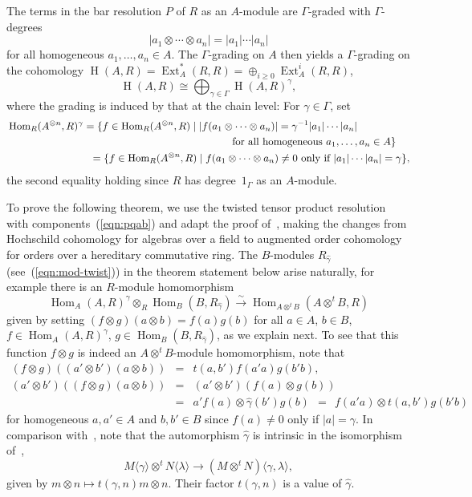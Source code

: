 \documentclass[11pt]{amsart}
\numberwithin{equation}{section}
\theoremstyle{definition}
\theoremstyle{remark}
\newcommand{\g}{\gamma}
\newcommand{\hg}{\widehat{\g}}
\newcommand\Ext{\operatorname{Ext}}
\newcommand\Homol{\operatorname{H}}
\newcommand\coh{\Homol}
\newcommand\ot{\otimes}
\newcommand\ott{\otimes^{t}\!}
\newcommand{\ttpt}{A\ott B}
\newcommand\Hom{\operatorname{Hom}}
\begin{document}
The terms in the bar resolution $P$ of $R$ as
an $A$-module are $\Gamma$-graded with $\Gamma$-degrees 
\[
    |a_1\ot\cdots\ot a_n| = |a_1|\cdots |a_n| 
\]
for all homogeneous $a_1,\ldots, a_n\in A$. 
The $\Gamma$-grading on $A$ then yields a $\Gamma$-grading
on the cohomology $\coh(A,R) = \Ext^*_A (R,R) = \oplus_{i\geq 0}\Ext^i_A(R,R)$,
\[
\coh(A,R) \cong \bigoplus_{\g\in\Gamma}  \coh(A,R)^{\g} ,
\]
where the grading is induced by that at the chain level:
For $\gamma\in\Gamma$, set 
\begin{equation*}
\begin{aligned}
 & \Hom_R (A^{\ot n}, R)^{\gamma} = 
    \{ f\in \Hom_R(A^{\ot n}, R)\mid
    |f(a_1\ot\cdots\ot a_n)| = \gamma^{-1}  |a_1|\cdots |a_n| \\
  & \hspace{7.5cm}   \mbox{ for all homogeneous } a_1,\ldots,a_n\in A\}\\
  & \hspace{2.8cm} = \{ f\in \Hom_R(A^{\ot n},R)\mid
       f(a_1\ot\cdots\ot a_n)\neq 0 \mbox{ only if }
         |a_1|\cdots |a_n| = \gamma \} ,
\end{aligned}
\end{equation*}
the second equality holding since $R$ has degree~$1_{\Gamma}$ as an $A$-module.

To prove the following theorem, we use 
the twisted tensor product resolution with components~(\ref{eqn:pqab}) and 
adapt the proof of~\cite[Theorem 3.1]{BW}, 
making the changes from Hochschild cohomology for algebras over a field
to augmented order cohomology for orders over a hereditary commutative ring. 
The $B$-modules $R_{\hg}$ (see~(\ref{eqn:mod-twist}))
in the theorem statement below arise naturally,
for example there is an $R$-module homomorphism 
\[
  \Hom_A(A,R)^{\gamma} \ot_R \Hom_B(B, R_{\hg}) \stackrel{\sim}{\longrightarrow}
   \Hom_{\ttpt} (\ttpt , R)
\]
given by setting
$(f\ot g)(a\ot b) = f(a)g(b)$ for all $a\in A$, $b\in B$,
$f\in\Hom_A(A,R)^{\gamma}$, $g\in \Hom_B(B,R_{\hg})$,
as we explain next.
To see that this function $f\ot g$ is indeed an $\ttpt$-module
homomorphism, note that 
\begin{eqnarray*}
  (f\ot g) ((a'\ot b')(a\ot b)) & = & t(a,b') f(a'a) g(b'b) , \\
  (a'\ot b') ( (f\ot g) (a\ot b)) & = & (a'\ot b') (f(a)\ot g(b)) \\
 & = & a'f(a) \ot \hg(b') g(b) \ \ = \ \ f(a'a) \ot t(a,b') g(b'b)
\end{eqnarray*}
for homogeneous $a,a'\in A$ and $b,b'\in B$ since $f(a)\neq 0$ only if $|a|=\gamma$.
In comparison with~\cite{BO}, note that the automorphism $\hg$ is intrinsic in the isomorphism
of~\cite[Lemma 3.2]{BO},  
\[
  M\langle \g \rangle \ot^t \! N\langle \lambda \rangle
  \rightarrow (M\ot^t\! N)\langle \g , \lambda \rangle ,
\]
given by $m\ot n \mapsto  t(\g,n) m\ot n$.
Their factor $t(\g,n)$ is a value of $\hg$.
\end{document}
